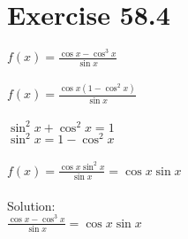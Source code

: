 \documentclass[a4paper, 10pt]{scrartcl}
\begin{document}
\section{Exercise 58.4}

$f(x) = \frac{\cos{x} - \cos^{3}{x}}{\sin{x}}$\\
\\
$f(x) = \frac{\cos{x}(1 - \cos^{2}{x})}{\sin{x}}$\\
\\
$\sin^{2}{x} + \cos^{2}{x} = 1$\\
$\sin^{2}{x} = 1 - \cos^{2}{x}$\\
\\
$f(x) = \frac{\cos{x} \sin^{2}{x}}{\sin{x}} = \cos{x} \sin{x}$\\
\\
Solution:\\
$\frac{\cos{x} - \cos^{3}{x}}{\sin{x}} = \cos{x}\sin{x}$\\
\end{document}

